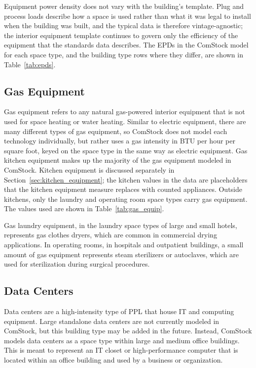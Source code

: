 Equipment power density does not vary with the building's template. Plug and process loads describe how a space is used rather than what it was legal to install when the building was built, and the typical data is therefore vintage-agnostic; the interior equipment template continues to govern only the efficiency of the equipment that the standards data describes. The EPDs in the ComStock model for each space type, and the building type rows where they differ, are shown in Table~\ref{tab:epds}.


\subsection{Gas Equipment}

Gas equipment refers to any natural gas-powered interior equipment that is not used for space heating or water heating. Similar to electric equipment, there are many different types of gas equipment, so ComStock does not model each technology individually, but rather uses a gas intensity in BTU per hour per square foot, keyed on the space type in the same way as electric equipment. Gas kitchen equipment makes up the majority of the gas equipment modeled in ComStock. Kitchen equipment is discussed separately in Section~\ref{sec:kitchen_equipment}; the kitchen values in the data are placeholders that the kitchen equipment measure replaces with counted appliances. Outside kitchens, only the laundry and operating room space types carry gas equipment. The values used are shown in Table~\ref{tab:gas_equip}.



Gas laundry equipment, in the laundry space types of large and small hotels, represents gas clothes dryers, which are common in commercial drying applications. In operating rooms, in hospitals and outpatient buildings, a small amount of gas equipment represents steam sterilizers or autoclaves, which are used for sterilization during surgical procedures.

\subsection{Data Centers}

Data centers are a high-intensity type of PPL that house IT and computing equipment. Large standalone data centers are not currently modeled in ComStock, but this building type may be added in the future. Instead, ComStock models data centers as a space type within large and medium office buildings. This is meant to represent an IT closet or high-performance computer that is located within an office building and used by a business or organization. 

